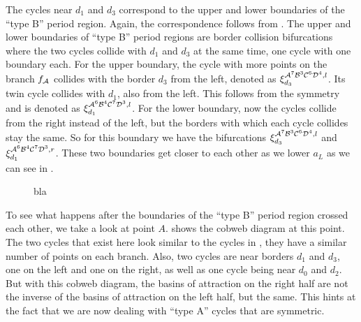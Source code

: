 The cycles near $d_1$ and $d_3$ correspond to the upper and lower boundaries of the ``type B'' period region.
Again, the correspondence follows from .
The upper and lower boundaries of ``type B'' period regions are border collision bifurcations where the two cycles collide with $d_1$ and $d_3$ at the same time, one cycle with one boundary each.
For the upper boundary, the cycle with more points on the branch $f_{\mathcal{A}}$ collides with the border $d_3$ from the left, denoted as $\xi_{d_3}^{\mathcal{A}^7\mathcal{B}^3\mathcal{C}^6\mathcal{D}^4, l}$.
Its twin cycle collides with $d_1$, also from the left.
This follows from the symmetry and is denoted as $\xi_{d_1}^{\mathcal{A}^6\mathcal{B}^4\mathcal{C}^7\mathcal{D}^3, l}$.
For the lower boundary, now the cycles collide from the right instead of the left, but the borders with which each cycle collides stay the same.
So for this boundary we have the bifurcations $\xi_{d_3}^{\mathcal{A}^7\mathcal{B}^3\mathcal{C}^6\mathcal{D}^4, l}$ and $\xi_{d_1}^{\mathcal{A}^6\mathcal{B}^4\mathcal{C}^7\mathcal{D}^3, r}$.
These two boundaries get closer to each other as we lower $a_L$ as we can see in .

\begin{figure}
    \centering
    \label{fig:minrep.just.before.disappearance}
    \caption{bla}
\end{figure}

To see what happens after the boundaries of the ``type B'' period region crossed each other, we take a look at point $A$.
 shows the cobweb diagram at this point.
The two cycles that exist here look similar to the cycles in , they have a similar number of points on each branch.
Also, two cycles are near borders $d_1$ and $d_3$, one on the left and one on the right, as well as one cycle being near $d_0$ and $d_2$.
But with this cobweb diagram, the basins of attraction on the right half are not the inverse of the basins of attraction on the left half, but the same.
This hints at the fact that we are now dealing with ``type A'' cycles that are symmetric.


